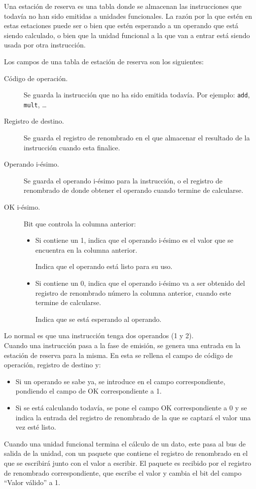 Una estación de reserva es una tabla donde se almacenan las instrucciones que todavía no han sido emitidas a unidades funcionales. La razón por la que estén en estas estaciones puede ser o bien que estén esperando a un operando que está siendo calculado, o bien que la unidad funcional a la que van a entrar está siendo usada por otra instrucción.

Los campos de una tabla de estación de reserva son los siguientes:
\begin{description}
    \item [Código de operación.] Se guarda la instrucción que no ha sido emitida todavía. Por ejemplo: \verb|add|, \verb|mult|, \ldots
    \item [Registro de destino.] Se guarda el registro de renombrado en el que almacenar el resultado de la instrucción cuando esta finalice.
    \item [Operando i-ésimo.] Se guarda el operando i-ésimo para la instrucción, o el registro de renombrado de donde obtener el operando cuando termine de calcularse.
    \item [OK i-ésimo.] Bit que controla la columna anterior:
        \begin{itemize}
            \item Si contiene un 1, indica que el operando i-ésimo es el valor que se encuentra en la columna anterior. 

                Indica que el operando está listo para su uso.
            \item Si contiene un 0, indica que el operando i-ésimo va a ser obtenido del registro de renombrado número la columna anterior, cuando este termine de calcularse. 

                Indica que se está esperando al operando.
        \end{itemize}
\end{description}
Lo normal es que una instrucción tenga dos operandos (1 y 2).\\

Cuando una instrucción pasa a la fase de emisión, se genera una entrada en la estación de reserva para la misma. En esta se rellena el campo de código de operación, registro de destino y:
\begin{itemize}
    \item Si un operando se sabe ya, se introduce en el campo correspondiente, pondiendo el campo de OK correspondiente a 1.
    \item Si se está calculando todavía, se pone el campo OK correspondiente a 0 y se indica la entrada del registro de renombrado de la que se captará el valor una vez esté listo.
\end{itemize}
Cuando una unidad funcional termina el cálculo de un dato, este pasa al bus de salida de la unidad, con un paquete que contiene el registro de renombrado en el que se escribirá junto con el valor a escribir. El paquete es recibido por el registro de renombrado correspondiente, que escribe el valor y cambia el bit del campo ``Valor válido'' a 1.

